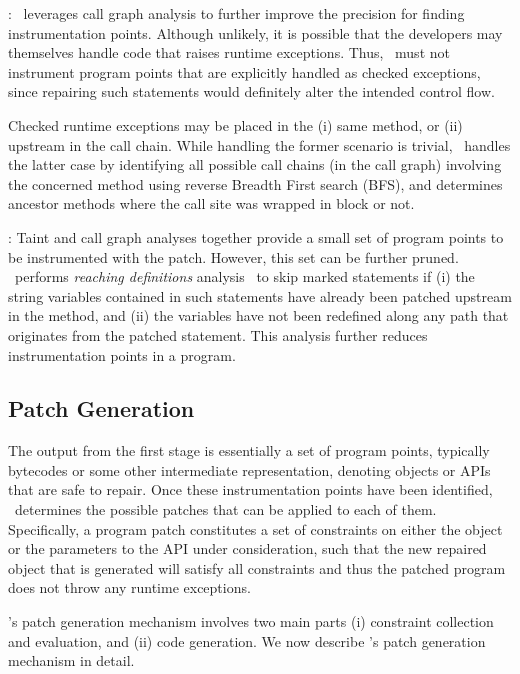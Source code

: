 : \tool\ leverages call graph analysis to
further improve the precision for finding instrumentation points. Although
unlikely, it is possible that the developers may themselves handle code that
raises runtime exceptions. Thus, \tool\ must not instrument program points that
are explicitly handled as checked exceptions, since repairing such statements
would definitely alter the intended control flow.

Checked runtime exceptions may be placed in the (i) same method, or (ii)
upstream in the call chain. While handling the former scenario is trivial,
\tool\ handles the latter case by identifying all possible call chains (in
the call graph) involving the concerned method using reverse Breadth First
search (BFS), and determines ancestor methods where the call site was wrapped in
 block or not.

: Taint and call graph analyses
together provide a small set of program points to be instrumented with the
patch. However, this set can be further pruned. \tool\ performs \textit{reaching
definitions} analysis~\cite{reaching_definitions} to skip marked statements if
(i) the string variables contained in such statements have already been patched
upstream in the method, and (ii) the variables have not been redefined along any
path that originates from the patched statement. This analysis further reduces
instrumentation points in a program.

\subsection{Patch Generation}
\label{sec:tool:stage2}

The output from the first stage is essentially a set of program points,
typically bytecodes or some other intermediate representation, denoting
 objects or APIs that are safe to repair. Once these
instrumentation points have been identified, \tool\ determines the
possible patches that can be applied to each of them. Specifically, a program
patch constitutes a set of constraints on either the  object or the
parameters to the  API under consideration, such that the new
repaired  object that is generated will satisfy all constraints and
thus the patched program does not throw any runtime exceptions.

\tool's patch generation mechanism involves two main parts (i) constraint
collection and evaluation, and (ii) code generation. We now describe \tool's
patch generation mechanism in detail. 

